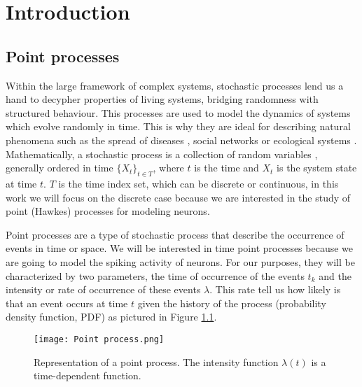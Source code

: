\chapter{Introduction}\label{ch:intro}
\section{Point processes} \label{sec:point_processes}
Within the large framework of complex systems, stochastic processes lend us a hand to decypher properties of living systems, bridging randomness with structured behaviour.
This processes are used to model the dynamics of systems which evolve randomly in time. This is why they are ideal for describing natural phenomena such as 
the spread of diseases \cite{Chowell}, social networks \cite{castellano2009statistical} or ecological systems \cite{azaele2016statistical}. Mathematically, a stochastic process
is a collection of random variables \cite{McKane}, generally ordered in time $ \{X_t\}_{t \in T} $, where $t$ is the time and $X_t$ is the system state at time $t$. $T$ is the time index set, 
which can be discrete or continuous, in this work we will focus on the discrete case because we are interested in the study of point (Hawkes) processes for modeling neurons. 

Point processes are a type of stochastic process that describe the occurrence of events in time or space. We will be interested in time point processes because 
we are going to model the spiking activity of neurons. For our purposes, they will be characterized by two parameters, the time of occurrence
of the events $t_k$ and the intensity or rate of occurrence of these events $\lambda$. This rate tell us how likely is that an event occurs at time $t$ given the history of the process 
(probability density function, PDF) as pictured in Figure \ref{f:point_process}.

\begin{figure}[H]
    \centering
    \texttt{[image: Point process.png]}
    \caption{Representation of a point process. The intensity function $\lambda(t)$ is a time-dependent function.}
    \label{f:point_process}
\end{figure}

